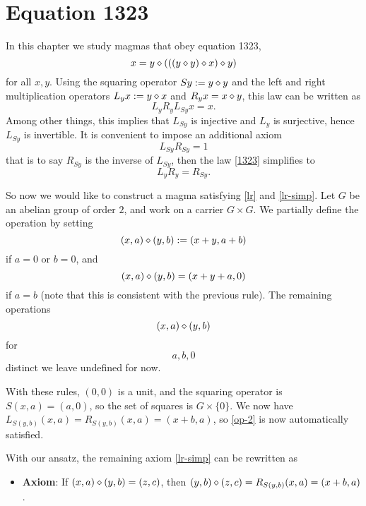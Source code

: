 \chapter{Equation 1323}\label{1323-chapter}

In this chapter we study magmas that obey equation 1323,
\begin{equation}\label{1323}
  x = y \diamond (((y \diamond y) \diamond x) \diamond y)
\end{equation}
for all $x,y$.  Using the squaring operator $Sy := y \diamond y$ and the left and right multiplication operators $L_y x := y \diamond x$ and $R_y x = x \diamond y$, this law can be written as
$$ L_y R_y L_{Sy} x = x.$$
Among other things, this implies that $L_{Sy}$ is injective and $L_y$ is surjective, hence $L_{Sy}$ is invertible.  It is convenient to impose an additional axiom
\begin{equation}\label{lr}
 L_{Sy} R_{Sy} = 1
\end{equation}
that is to say $R_{Sy}$ is the inverse of $L_{Sy}$, then the law \eqref{1323} simplifies to
\begin{equation}\label{lr-simp}
  L_{y} R_{y} = R_{Sy}.
 \end{equation}

 So now we would like to construct a magma satisfying \eqref{lr} and \eqref{lr-simp}.  Let $G$ be an abelian group of order $2$, and work on a carrier $G \times G$.  We partially define the operation by setting
\begin{equation}\label{op-1}
 (x,a) \diamond (y,b) := (x+y, a+b)
\end{equation}
if $a=0$ or $b=0$, and
\begin{equation}\label{op-2}
  (x,a) \diamond (y,b) = (x+y+a, 0)
\end{equation}
if $a=b$ (note that this is consistent with the previous rule).   The remaining operations $$(x,a) \diamond (y,b)$$ for $$a,b,0$$ distinct we leave undefined for now.

With these rules, $(0,0)$ is a unit, and the squaring operator is $S(x,a) = (a,0)$, so the set of squares is $G \times \{0\}$.  We now have $L_{S(y,b)} (x,a) = R_{S(y,b)} (x,a) = (x+b, a)$, so \eqref{op-2} is now automatically satisfied.

With our ansatz, the remaining axiom \eqref{lr-simp} can be rewritten as

\begin{itemize}
\item {\bf Axiom}: If $(x,a) \diamond (y,b) = (z,c)$, then $(y,b) \diamond (z,c) = R_{S(y,b)} (x,a) = (x+b,a)$.
\end{itemize}

